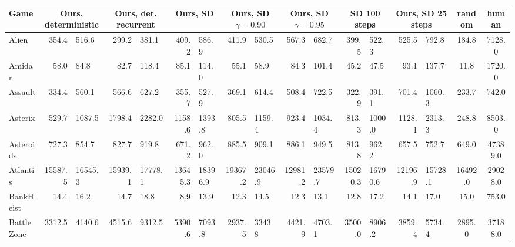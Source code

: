 \begin{landscape}
\begin{changemargin}{0cm}{0cm}
\begin{center}
\vspace*{\fill}
\setlength{\tabcolsep}{5pt}
\begin{table}[!htbp]
\scriptsize
\begin{tabular}{l|rl|rl|rl|rl|rl|rl|rl|c|c}

Game &          \multicolumn{2}{|c|}{Ours, deterministic}  &     \multicolumn{2}{|c|}{Ours, det. recurrent}   &     \multicolumn{2}{|c|}{Ours, SD} &     \multicolumn{2}{|c|}{Ours, SD $\gamma=0.90$}   &     \multicolumn{2}{|c|}{Ours, SD $\gamma=0.95$} &          \multicolumn{2}{|c|}{SD 100 steps}	&     \multicolumn{2}{|c|}{Ours, SD 25 steps} &		random &		human\\
\midrule
Alien          &    354.4 &    516.6 &    299.2 &    381.1 &    409.2 &    586.9 &    411.9 &    530.5 &    567.3 &    682.7 &    399.5 &    522.3 &    525.5 &    792.8 &    184.8 &   7128.0 \\
Amidar         &     58.0 &     84.8 &     82.7 &    118.4 &     85.1 &    114.0 &     55.1 &     58.9 &     84.3 &    101.4 &     45.2 &     47.5 &     93.1 &    137.7 &     11.8 &   1720.0 \\
Assault        &    334.4 &    560.1 &    566.6 &    627.2 &    355.7 &    527.9 &    369.1 &    614.4 &    508.4 &    722.5 &    322.9 &    391.1 &    701.4 &   1060.3 &    233.7 &    742.0 \\
Asterix        &    529.7 &   1087.5 &   1798.4 &   2282.0 &   1158.6 &   1393.8 &    805.5 &   1159.4 &    923.4 &   1034.4 &    813.3 &   1000.0 &   1128.1 &   2313.3 &    248.8 &   8503.0 \\
Asteroids      &    727.3 &    854.7 &    827.7 &    919.8 &    671.2 &    962.0 &    885.5 &    909.1 &    886.1 &    949.5 &    813.8 &    962.2 &    657.5 &    752.7 &    649.0 &  47389.0 \\
Atlantis       &  15587.5 &  16545.3 &  15939.1 &  17778.1 &  13645.3 &  18396.9 &  19367.2 &  23046.9 &  12981.2 &  23579.7 &  15020.3 &  16790.6 &  12196.9 &  15728.1 &  16492.0 &  29028.0 \\
BankHeist      &     14.4 &     16.2 &     14.7 &     18.8 &      8.9 &     13.9 &     12.3 &     14.5 &     12.3 &     13.1 &     12.8 &     17.2 &     14.1 &     17.0 &     15.0 &    753.0 \\
BattleZone     &   3312.5 &   4140.6 &   4515.6 &   9312.5 &   5390.6 &   7093.8 &   2937.5 &   3343.8 &   4421.9 &   4703.1 &   3500.0 &   8906.2 &   3859.4 &   5734.4 &   2895.0 &  37188.0 \\

\end{tabular}
\end{table}
\end{center}
\end{changemargin}
\end{landscape}
